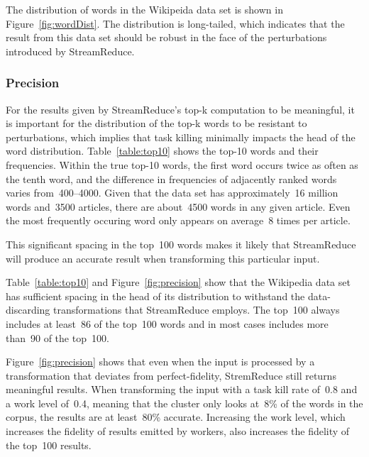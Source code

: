\documentclass[12pt,twocolumn]{article}
\begin{document}
The distribution of words in the Wikipeida data set is
shown in Figure~\ref{fig:wordDist}. The distribution is long-tailed, which indicates
that the result from this data set should be robust in the face of
the perturbations introduced by StreamReduce.

\subsubsection{Precision}
For the results given by StreamReduce's top-k computation to be meaningful,
it is important for the distribution of the top-k words to be resistant to perturbations,
which implies that task killing minimally impacts the head of the word distribution.
Table~\ref{table:top10} shows the top-10 words and their frequencies. Within the true top-10
words, the first word occurs twice as often as the tenth word, and the difference in frequencies
of adjacently ranked words varies from~400--4000. Given that the data set has approximately~16 million
words and~3500 articles, there are about~4500 words in any given article. Even the most frequently
occuring word only appears on average~8 times per article.

This significant spacing in the top~100 words makes it likely that
StreamReduce will produce an accurate result when transforming this particular input.

Table~\ref{table:top10} and Figure~\ref{fig:precision} show that the Wikipedia
data set has sufficient spacing in the head of its distribution to withstand the
data-discarding transformations that StreamReduce employs. The top~100 always includes at
least~86 of the top~100 words and in most cases includes more than~90 of the top~100.

Figure~\ref{fig:precision} shows that even when the input is processed by a transformation that deviates
from perfect-fidelity, StremReduce still returns meaningful results.
When transforming the input with a task kill rate of~0.8 and a work level of~0.4,
meaning that the cluster only looks at~8\% of the words in the corpus, the results
are at least~80\% accurate. Increasing the work level, which increases the fidelity of
results emitted by workers, also increases the fidelity of the top~100 results.
\end{document}
